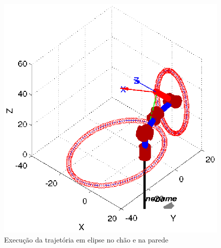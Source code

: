 \documentclass{article}
\begin{document}
\begin{figure}[H]
	\centering
	\includegraphics[width=0.8\linewidth]{../ellipses}
	\caption{Execução da trajetória em elipse no chão e na parede}
	\label{fig:elipsec}
\end{figure}
\end{document}
